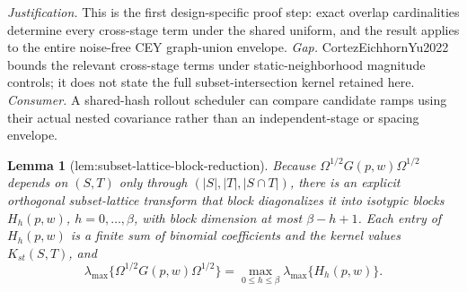 \documentclass{article}
\newtheorem{lemma}{Lemma}
\begin{document}
\par\smallskip\noindent \textit{Justification.} This is the first design-specific proof step: exact overlap cardinalities determine every cross-stage term under the shared uniform, and the result applies to the entire noise-free CEY graph-union envelope. \textit{Gap.} CortezEichhornYu2022 bounds the relevant cross-stage terms under static-neighborhood magnitude controls; it does not state the full subset-intersection kernel retained here. \textit{Consumer.} A shared-hash rollout scheduler can compare candidate ramps using their actual nested covariance rather than an independent-stage or spacing envelope.

\begin{lemma}[lem:subset-lattice-block-reduction]\label{lem:subset-lattice-block-reduction}
Because \(\Omega^{1/2}G(p,w)\Omega^{1/2}\) depends on \((S,T)\) only through \((|S|,|T|,|S\cap T|)\), there is an explicit orthogonal subset-lattice transform that block diagonalizes it into isotypic blocks \(H_h(p,w)\), \(h=0,\ldots,\beta\), with block dimension at most \(\beta-h+1\). Each entry of \(H_h(p,w)\) is a finite sum of binomial coefficients and the kernel values \(K_{st}(S,T)\), and \[\lambda_{\max}\{\Omega^{1/2}G(p,w)\Omega^{1/2}\}=\max_{0\le h\le\beta}\lambda_{\max}\{H_h(p,w)\}.\]
\end{lemma}
\end{document}
